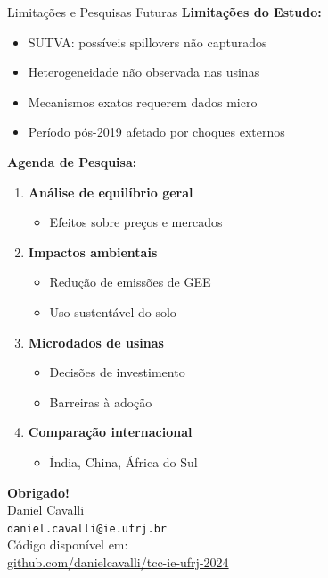 \documentclass[10pt,aspectratio=169]{beamer}
\begin{document}
\begin{frame}{Limitações e Pesquisas Futuras}
\textbf{Limitações do Estudo:}
\begin{itemize}
    \item SUTVA: possíveis spillovers não capturados
    \item Heterogeneidade não observada nas usinas
    \item Mecanismos exatos requerem dados micro
    \item Período pós-2019 afetado por choques externos
\end{itemize}

\textbf{Agenda de Pesquisa:}
\begin{enumerate}
    \item \textbf{Análise de equilíbrio geral}
    \begin{itemize}
        \item Efeitos sobre preços e mercados
    \end{itemize}
    
    \item \textbf{Impactos ambientais}
    \begin{itemize}
        \item Redução de emissões de GEE
        \item Uso sustentável do solo
    \end{itemize}
    
    \item \textbf{Microdados de usinas}
    \begin{itemize}
        \item Decisões de investimento
        \item Barreiras à adoção
    \end{itemize}
    
    \item \textbf{Comparação internacional}
    \begin{itemize}
        \item Índia, China, África do Sul
    \end{itemize}
\end{enumerate}
\end{frame}

\begin{frame}{}
\centering
\Large
\textbf{Obrigado!}\\
\vspace{1cm}
\normalsize
Daniel Cavalli\\
\texttt{daniel.cavalli@ie.ufrj.br}\\
\vspace{0.5cm}
Código disponível em:\\
\url{github.com/danielcavalli/tcc-ie-ufrj-2024}
\end{frame}
\end{document}
